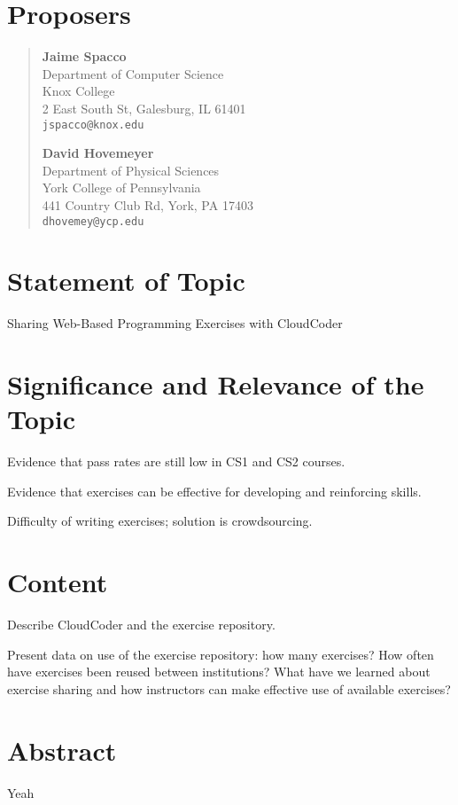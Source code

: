 \documentclass[11pt]{article}
\begin{document}
\section*{Proposers}

\begin{quote}
\begin{minipage}{2.75in}
{\large\bf Jaime Spacco}\\
Department of Computer Science\\
Knox College\\
2 East South St, Galesburg, IL 61401\\
{\tt jspacco@knox.edu}
\end{minipage}
\begin{minipage}{2.75in}
{\large\bf David Hovemeyer}\\
Department of Physical Sciences\\
York College of Pennsylvania\\
441 Country Club Rd, York, PA 17403\\
{\tt dhovemey@ycp.edu}
\end{minipage}
\end{quote}

\section*{Statement of Topic}

{\large Sharing Web-Based Programming Exercises with CloudCoder}

\section*{Significance and Relevance of the Topic}

Evidence that pass rates are still low in CS1 and CS2 courses.

Evidence that exercises can be effective for developing and reinforcing skills.

Difficulty of writing exercises; solution is crowdsourcing.

\section*{Content}

Describe CloudCoder and the exercise repository.

Present data on use of the exercise repository: how many exercises? How often have exercises
been reused between institutions?  What have we learned about exercise sharing and how
instructors can make effective use of available exercises?

\section*{Abstract}

Yeah
\end{document}
